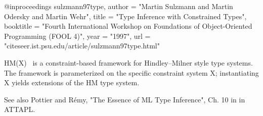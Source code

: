 \documentclass[nocopyrightspace,preprint,10pt]{sigplanconf}
\begin{document}

@inproceedings{ sulzmann97type,
    author = "Martin Sulzmann and Martin Odersky and Martin Wehr",
    title = "Type Inference with Constrained Types",
    booktitle = "Fourth International Workshop on Foundations of Object-Oriented Programming ({FOOL} 4)",
    year = "1997",
    url = "citeseer.ist.psu.edu/article/sulzmann97type.html" }

HM(X)~\cite{sulzmann97type,pottier01a} is a constraint-based framework
for Hindley--Milner style type systems.
The framework is parameterized on the specific constraint system
X; instantiating X yields extensions of the HM type system.

See also Pottier and R{\'e}my, "The Essence of ML Type Inference",
Ch. 10 in in ATTAPL.
\end{document}
